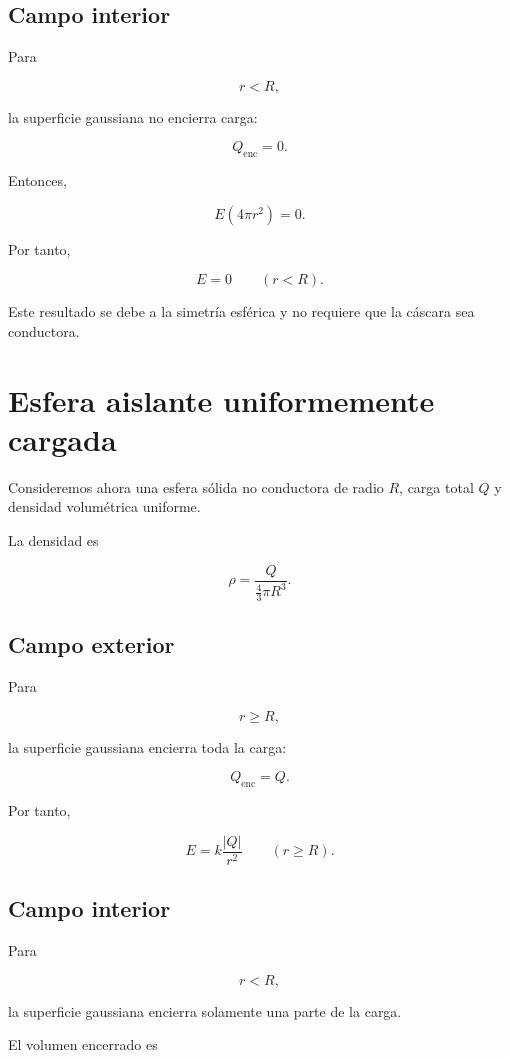 \subsection{Campo interior}

Para

\[
r<R,
\]

la superficie gaussiana no encierra carga:

\[
Q_{\text{enc}}=0.
\]

Entonces,

\[
E(4\pi r^2)=0.
\]

Por tanto,

\begin{equation}
\boxed{E=0\qquad(r<R)}.
\label{eq:campo_cascara_interior}
\end{equation}

Este resultado se debe a la simetría esférica y no requiere que la cáscara sea conductora.


\section{Esfera aislante uniformemente cargada}

Consideremos ahora una esfera sólida no conductora de radio \(R\), carga total \(Q\)
y densidad volumétrica uniforme.

La densidad es

\[
\rho=\frac{Q}{\frac43\pi R^3}.
\]


\subsection{Campo exterior}

Para

\[
r\geq R,
\]

la superficie gaussiana encierra toda la carga:

\[
Q_{\text{enc}}=Q.
\]

Por tanto,

\[
\boxed{
E=k\frac{|Q|}{r^2}
\qquad(r\geq R)
}.
\]


\subsection{Campo interior}

Para

\[
r<R,
\]

la superficie gaussiana encierra solamente una parte de la carga.

El volumen encerrado es


